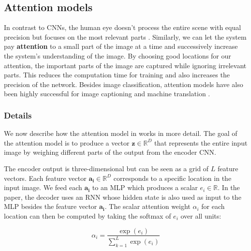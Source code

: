 \subsection{Attention models}
\label{ssec:attention}


In contrast to CNNs, the human eye doesn't process the entire scene with equal precision but focuses on the most relevant parts \cite{DeepMindAttention}.
Similarly, we can let the system pay \textbf{attention} to a small part of the image at a time and successively increase the system's understanding of the image.
By choosing good locations for our attention, the important parts of the image are captured while ignoring irrelevant parts.
This reduces the computation time for training and also increases the precision of the network.
Besides image classification, attention models have also been highly successful for image captioning \cite{AttendAndTell} and machine translation \cite{machine_translation_attention}.

\subsubsection{Details}
We now describe how the attention model in \cite{AttendAndTell} works in more detail.
The goal of the attention model is to produce a vector $\mathbf{z} \in \mathbb{R}^D$ that represents the entire input image by weighing different parts of the output from the encoder CNN.

The encoder output is three-dimensional but can be seen as a grid of $L$ feature vectors. Each feature vector $\mathbf{a_i} \in \mathbb{R}^D$ corresponds to a specific location in the input image. We feed each $\mathbf{a_i}$ to an MLP which produces a scalar $e_i \in \mathbb{R}$. In the paper, the decoder uses an RNN whose hidden state is also used as input to the MLP besides the feature vector $\mathbf{a_i}$.
The scalar attention weight $\alpha_i$ for each location can then be computed by taking the softmax of $e_i$ over all units:

\[
\alpha_i = \frac{ \exp(e_i) }{ \sum_{k=1}^L \exp(e_i) }
\]

